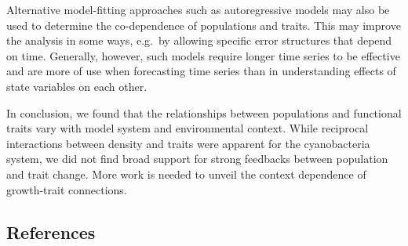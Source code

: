 \documentclass[
  letterpaper,
  DIV=11,
  numbers=noendperiod]{scrartcl}
\begin{document}
Alternative model-fitting approaches such as autoregressive models may
also be used to determine the co-dependence of populations and traits.
This may improve the analysis in some ways, e.g.~by allowing specific
error structures that depend on time. Generally, however, such models
require longer time series to be effective and are more of use when
forecasting time series than in understanding effects of state variables
on each other.

In conclusion, we found that the relationships between populations and
functional traits vary with model system and environmental context.
While reciprocal interactions between density and traits were apparent
for the cyanobacteria system, we did not find broad support for strong
feedbacks between population and trait change. More work is needed to
unveil the context dependence of growth-trait connections.

\subsection{References}\label{references}
\end{document}
